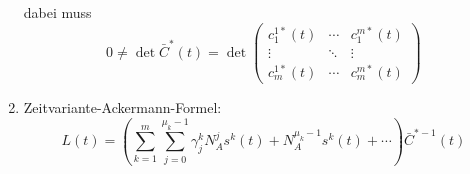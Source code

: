 \begin{enumerate}
        dabei muss
        \begin{equation}
            0 \neq \det \bar{C}^* (t) = \det \begin{pmatrix}
                c_1^{1*}(t) & \cdots & c_1^{m*}(t) \\
                \vdots & \ddots & \vdots \\
                c_m^{1*}(t) & \cdots & c_m^{m*}(t)
            \end{pmatrix}
        \end{equation}
    \item Zeitvariante-Ackermann-Formel:
        \begin{equation}
            L(t) = \left( \sum_{k=1}^m \sum_{j=0}^{\mu_k -1}
                \gamma_j^k N_A^j s^k(t) + N_A^{\mu_k -1} s^k(t) + \cdots \right) 
                \bar{C}^{*-1}(t)
        \end{equation}
\end{enumerate}
